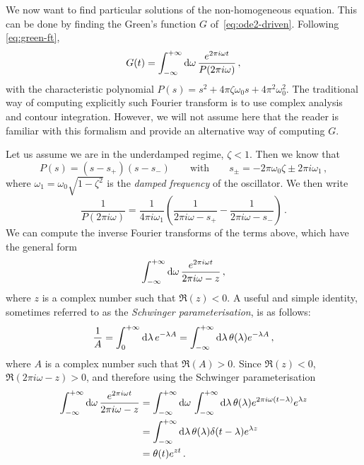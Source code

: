We now want to find particular solutions of the non-homogeneous equation. This can be
done by finding the Green's function $G$ of~\cref{eq:ode2-driven}. Following
\cref{eq:green-ft},
\begin{equation}
  G(t)=\int_{-\infty}^{+\infty}\mathrm{d}{\omega}\,\frac{e^{2\pi i\omega t}}{P(2\pi i\omega)}\,,
\end{equation}
with the characteristic polynomial $P(s)=s^2+4\pi\zeta\omega_0s+4\pi^2\omega_0^2$. The
traditional way of computing explicitly such Fourier transform is to use complex analysis
and contour integration. However, we will not assume here that the reader is familiar with
this formalism and provide an alternative way of computing $G$.

Let us assume we are in the underdamped regime, \ie $\zeta<1$. Then we know that
\begin{equation}
  P(s)=(s-s_+)(s-s_-)\qquad\text{with}\qquad
  s_\pm=-2\pi\omega_0\zeta\pm 2\pi i\omega_1\,,
\end{equation}
where $\omega_1=\omega_0\sqrt{1-\zeta^2}$ is the \emph{damped frequency} of the
oscillator. We then write
\begin{equation}
  \frac{1}{P(2\pi i\omega)}=\frac{1}{4\pi i\omega_1}\left(\frac{1}{2\pi i\omega-s_+}
  -\frac{1}{2\pi i\omega-s_-}\right)\,.
  \label{eq:p-part-frac}
\end{equation}
We can compute the inverse Fourier transforms of the terms above, which have the general
form
\begin{equation}
  \int_{-\infty}^{+\infty}\mathrm{d}{\omega}\,\frac{e^{2\pi i\omega t}}{2\pi i \omega-z}\,,
\end{equation}
where $z$ is a complex number such that $\Re(z)<0$. A useful and simple identity,
sometimes referred to as the \emph{Schwinger parameterisation}, is as follows:
\begin{equation}
  \frac{1}{A}=\int_0^{+\infty}\mathrm{d}\lambda\,e^{-\lambda A}
  =\int_{-\infty}^{+\infty}\mathrm{d}{\lambda}\,\theta(\lambda)e^{-\lambda A}\,,
\end{equation}
where $A$ is a complex number such that $\Re(A)>0$. Since $\Re(z)<0$, $\Re(2\pi i
\omega-z)>0$, and therefore using the Schwinger parameterisation
\begin{align}
  \int_{-\infty}^{+\infty}\mathrm{d}{\omega}\,\frac{e^{2\pi i\omega t}}{2\pi i \omega-z}&=
  \int_{-\infty}^{+\infty}\mathrm{d}{\omega}\,\int_{-\infty}^{+\infty}\mathrm{d}{\lambda}\,\theta(\lambda)
  e^{2\pi i\omega(t-\lambda)}e^{\lambda z}\notag\\
  &=\int_{-\infty}^{+\infty}\mathrm{d}{\lambda}\,\theta(\lambda)\delta(t-\lambda)e^{\lambda z}\notag\\
  &=\theta(t)e^{zt}\,.
\end{align}
